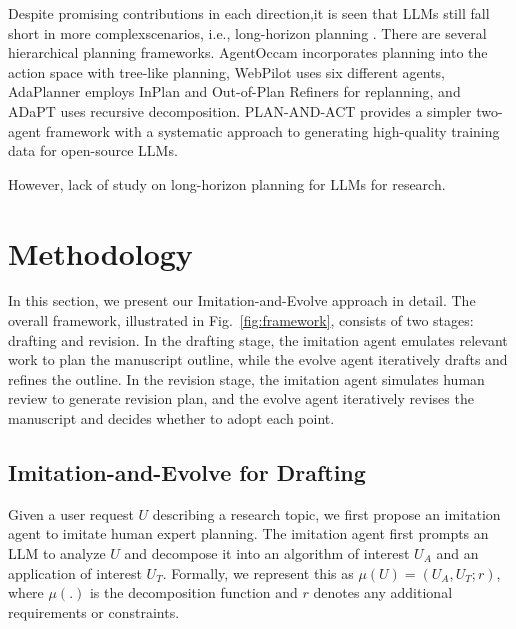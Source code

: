 \documentclass[manuscript,review,anonymous]{acmart}
\begin{document}
Despite promising contributions in each direction,it is seen that LLMs still fall short in more complexscenarios, i.e., long-horizon planning \cite{chen2024can}.  There are several hierarchical planning frameworks. AgentOccam \cite{yangagentoccam} incorporates planning into the action space with tree-like planning, WebPilot \cite{zhang2025webpilot} uses six
different agents, AdaPlanner \cite{sun2023adaplanner} employs InPlan and Out-of-Plan Refiners for replanning, and ADaPT \cite{prasad2024adapt} uses recursive decomposition. PLAN-AND-ACT \cite{erdogan2025plan} provides a simpler two-agent framework with a systematic approach to generating high-quality training data for open-source LLMs.

However, lack of study on long-horizon planning for LLMs for research.

\section{Methodology}

In this section, we present our Imitation-and-Evolve approach in detail. The overall framework, illustrated in Fig.~\ref{fig:framework}, consists of two stages: drafting and revision. In the drafting stage, the imitation agent emulates relevant work to plan the manuscript outline, while the evolve agent iteratively drafts and refines the outline. In the revision stage, the imitation agent simulates human review to generate revision plan, and the evolve agent iteratively revises the manuscript and decides whether to adopt each point.

\subsection{Imitation-and-Evolve for Drafting}

Given a user request $U$ describing a research topic, we first propose an imitation agent to imitate human expert planning. The imitation agent first prompts an LLM to analyze $U$ and decompose it into an algorithm of interest $U_A$ and an application of interest $U_T$. Formally, we represent this as $\mu(U) = (U_A, U_T; r)$, where $\mu(.)$ is the decomposition function and $r$ denotes any additional requirements or constraints.
\end{document}
